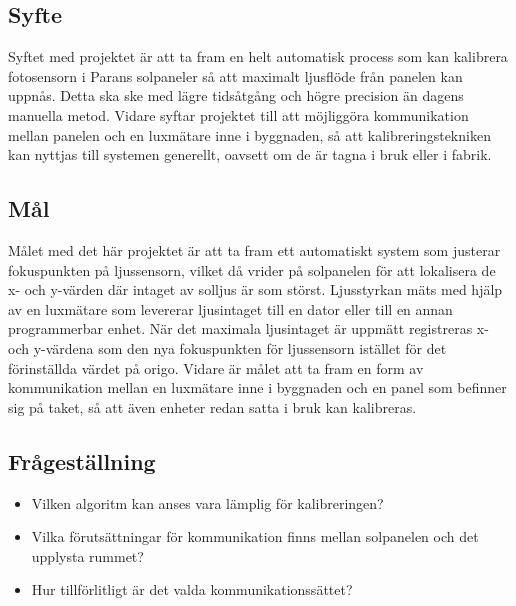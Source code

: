     \subsection{Syfte} %
    \label{sub:syfte}
          Syftet med projektet är att ta fram en helt automatisk process som kan kalibrera fotosensorn i Parans solpaneler så att maximalt ljusflöde från panelen kan uppnås. Detta ska ske med lägre tidsåtgång och högre precision än dagens manuella metod. 
          Vidare syftar projektet till att möjliggöra kommunikation mellan panelen och en luxmätare inne i byggnaden, så att kalibreringstekniken kan nyttjas till systemen generellt, oavsett om de är tagna i bruk eller i fabrik.

    \subsection{Mål} %
    \label{sub:mal}
        Målet med det här projektet är att ta fram ett automatiskt system som justerar fokuspunkten på ljussensorn, vilket då vrider på solpanelen för att lokalisera de x- och y-värden där intaget av solljus är som störst. 
        Ljusstyrkan mäts med hjälp av en luxmätare som levererar ljusintaget till en dator eller till en annan programmerbar enhet. 
        När det maximala ljusintaget är uppmätt registreras x- och y-värdena som den nya fokuspunkten för ljussensorn istället för det förinställda värdet på origo. 
        Vidare är målet att ta fram en form av kommunikation mellan en luxmätare inne i byggnaden och en panel som befinner sig på taket, så att även enheter redan satta i bruk kan kalibreras. 


    \subsection{Frågeställning} %
    \label{sub:fragestallning}
        \begin{itemize}
            \item Vilken algoritm kan anses vara lämplig för kalibreringen?\\
            \item Vilka förutsättningar för kommunikation finns mellan solpanelen och det upplysta rummet? \\
            \item Hur tillförlitligt är det valda kommunikationssättet? \\
            
        \end{itemize}

